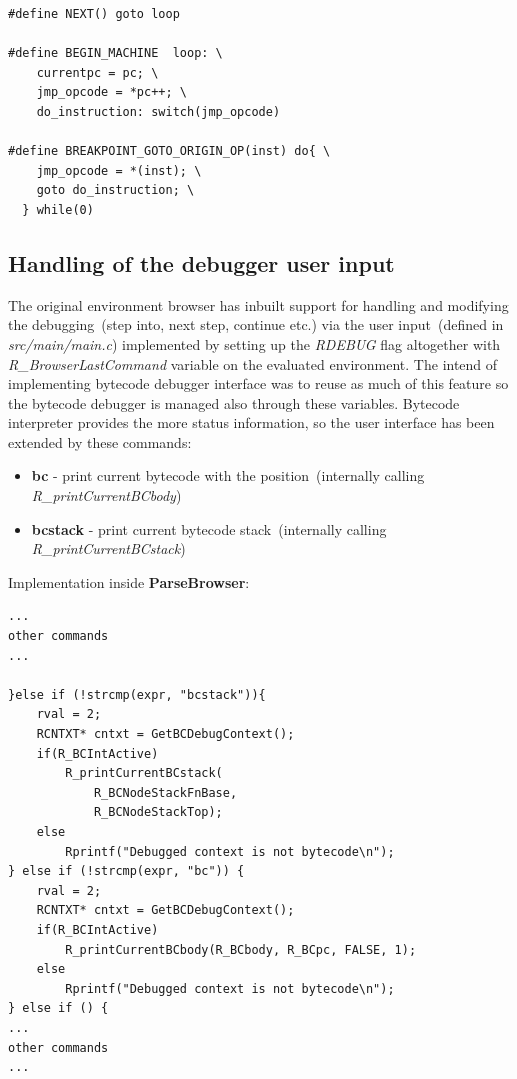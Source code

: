 \documentclass[thesis=M,english]{FITthesis}[2018/10/20]
\begin{document}
\begin{lstlisting}
#define NEXT() goto loop

#define BEGIN_MACHINE  loop: \
    currentpc = pc; \
    jmp_opcode = *pc++; \
    do_instruction: switch(jmp_opcode)

#define BREAKPOINT_GOTO_ORIGIN_OP(inst) do{ \
    jmp_opcode = *(inst); \
    goto do_instruction; \
  } while(0)
\end{lstlisting}

\subsection{Handling of the debugger user input}

The original environment browser has inbuilt support for handling and modifying the debugging~(step into, next step, continue etc.) via the user input~(defined in \textit{src/main/main.c}) implemented by setting up the \textit{RDEBUG} flag altogether with \textit{R{\_}BrowserLastCommand} variable on the evaluated environment. The intend of implementing bytecode debugger interface was to reuse as much of this feature so the bytecode debugger is managed also through these variables. Bytecode interpreter provides the more status information, so the user interface has been extended by these commands:

\begin{itemize}
	\item \textbf{bc} - print current bytecode with the position~(internally calling \textit{R{\_}printCurrentBCbody})
	\item \textbf{bcstack} - print current bytecode stack~(internally calling \textit{R{\_}printCurrentBCstack})
\end{itemize}

Implementation inside \textbf{ParseBrowser}:
\begin{lstlisting}
...
other commands
...

}else if (!strcmp(expr, "bcstack")){
    rval = 2;
    RCNTXT* cntxt = GetBCDebugContext();
    if(R_BCIntActive)
        R_printCurrentBCstack(
            R_BCNodeStackFnBase, 
            R_BCNodeStackTop);
    else
        Rprintf("Debugged context is not bytecode\n");
} else if (!strcmp(expr, "bc")) {
    rval = 2;
    RCNTXT* cntxt = GetBCDebugContext();
    if(R_BCIntActive)
        R_printCurrentBCbody(R_BCbody, R_BCpc, FALSE, 1);
    else
        Rprintf("Debugged context is not bytecode\n");
} else if () {
...
other commands
...
\end{lstlisting}
\end{document}
